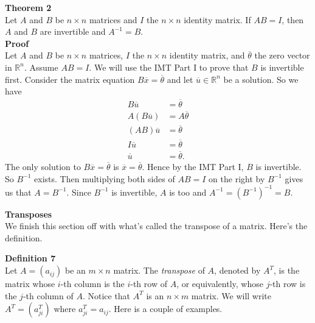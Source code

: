 \documentclass[12pt]{article}
\def\v#1{\vspace{#1in}} \def\h#1{\hspace{#1in}}
\def\bar#1{\overline{#1}}
\def\th{\theta} \def\al{\alpha} \def\ba{\beta} \def\ga{\gamma}
\def\R{\mathbb{R}} \def\Q{\mathbb{Q}} \def\N{\mathbb{N}} \def\Z{\mathbb{Z}} \def\P{\mathbb{P}}
\begin{document}
\noindent
{\bf Theorem 2} \\
Let $A$ and $B$ be $n \times n$ matrices and $I$ the $n \times n$ identity matrix. If $AB = I$, then $A$ and $B$ are invertible and $A^{-1} = B$. \\
\noindent
{\bf Proof} \\
Let $A$ and $B$ be $n \times n$ matrices, $I$ the $n \times n$ identity matrix, and $\bar{\th}$ the zero vector in $\R^n$. Assume $AB = I$. We will use the IMT Part I to prove that $B$ is invertible first. Consider the matrix equation $B\bar{x} = \bar{\th}$ and let $\bar{u} \in \R^n$ be a solution. So we have 
\begin{align*}
B\bar{u} &= \bar{\th} \\
A(B\bar{u}) &= A\bar{\th} \\
(AB)\bar{u} &= \bar{\th} \\
I\bar{u} &= \bar{\th} \\
\bar{u} &= \bar{\th}.
\end{align*}
The only solution to $B\bar{x} = \bar{\th}$ is $\bar{x} = \bar{\th}$. Hence by the IMT Part I, $B$ is invertible. So $B^{-1}$ exists. Then multiplying both sides of $AB = I$ on the right by $B^{-1}$ gives us that $A = B^{-1}$. Since $B^{-1}$ is invertible, $A$ is too and $A^{-1} = (B^{-1})^{-1} = B$.

\v{.25}

\noindent
{\bf Transposes} \\
We finish this section off with what's called the transpose of a matrix. Here's the definition.

\noindent
{\bf Definition 7} \\
Let $A = (a_{ij})$ be an $m \times n$ matrix. The {\itshape transpose} of $A$, denoted by $A^T$, is the matrix whose $i$-th column is the $i$-th row of $A$, or equivalently, whose $j$-th row is the $j$-th column of $A$. Notice that $A^T$ is an $n \times m$ matrix. We will write $A^T = (a^{T}_{ji})$ where $a^{T}_{ji} = a_{ij}$. Here is a couple of examples.
\end{document}
